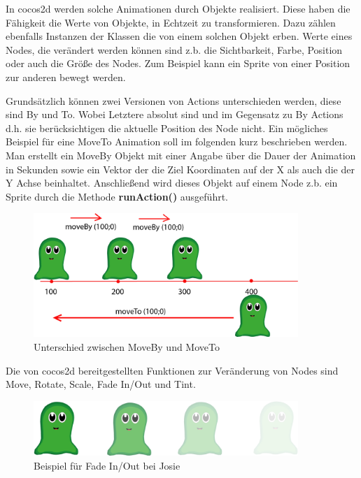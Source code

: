 In cocos2d werden solche Animationen durch  Objekte realisiert. Diese haben die Fähigkeit die Werte von  Objekte, in Echtzeit zu transformieren. Dazu zählen ebenfalls Instanzen der Klassen die von einem solchen Objekt erben. Werte eines Nodes, die verändert werden können sind z.b. die Sichtbarkeit, Farbe, Position oder auch die Größe des Nodes. Zum Beispiel kann ein Sprite von einer Position zur anderen bewegt werden.

Grundsätzlich können zwei Versionen von Actions unterschieden werden, diese sind By und To. Wobei Letztere absolut sind und im Gegensatz zu By Actions d.h. sie berücksichtigen die aktuelle Position des Node nicht. Ein mögliches Beispiel für eine MoveTo Animation soll im folgenden kurz beschrieben werden. Man erstellt ein MoveBy Objekt mit einer Angabe über die Dauer der Animation in Sekunden sowie ein Vektor der die Ziel Koordinaten auf der X als auch die der Y Achse beinhaltet. Anschließend wird dieses Objekt auf einem Node z.b. ein Sprite durch die Methode \textbf{runAction()} ausgeführt. 

\begin{figure}[H]
 \centering
  \includegraphics[width=10cm]{resources/josiedoku6}
  \caption{Unterschied zwischen MoveBy und MoveTo}
  \label{fig:josiemoveByTo} 
\end{figure}

Die von cocos2d bereitgestellten Funktionen zur Veränderung von Nodes sind Move, Rotate, Scale, Fade In/Out und Tint.

\begin{figure}[H]
 \centering
  \includegraphics[width=10cm]{resources/josiedoku5}
  \caption{Beispiel für Fade In/Out bei Josie}
  \label{fig:fade} 
\end{figure}


